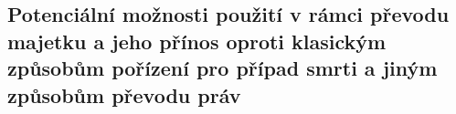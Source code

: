 \documentclass{article}
\begin{document}

\newpage

\subsection{Potenciální možnosti použití v rámci převodu majetku a jeho přínos oproti klasickým způsobům pořízení pro případ smrti a jiným způsobům převodu práv}



\end{document}
